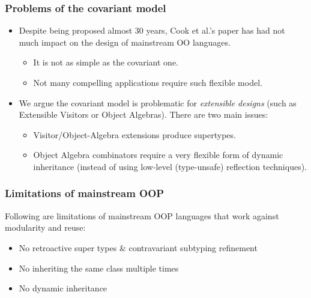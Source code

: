 \documentclass{beamer}
\begin{document}
\begin{frame}
  \frametitle{Problems of the covariant model}

  \begin{itemize}
  \item Despite being proposed almost 30 years, Cook et al.'s paper has had not
    much impact on the design of mainstream OO languages.
    \begin{itemize}
    \item It is not as simple as the covariant one.
    \item Not many compelling applications require such flexible model.
    \end{itemize}

  \item We argue the covariant model is problematic for \textit{extensible
      designs} (such as Extensible Visitors or Object Algebras). There are two
    main issues:
    \begin{itemize}
    \item Visitor/Object-Algebra extensions produce supertypes.
    \item Object Algebra combinators require a very flexible form of dynamic
      inheritance (instead of using low-level (type-unsafe) reflection
      techniques).
    \end{itemize}


  \end{itemize}

\end{frame}


\begin{frame}[fragile]
  \frametitle{Limitations of mainstream OOP}

  Following are limitations of mainstream OOP languages that work against
  modularity and reuse:

  \begin{alertblock}{}
  \begin{itemize}
  \item No retroactive super types \& contravariant subtyping refinement
  \item No inheriting the same class multiple times
  \item No dynamic inheritance
  \end{itemize}


  \end{alertblock}


\end{frame}
\end{document}
